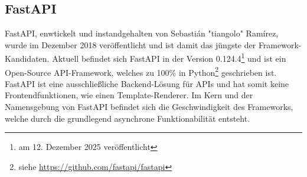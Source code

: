 \documentclass[letterpaper,11pt,leqno]{article}
\begin{document}
\subsection{FastAPI}
FastAPI, enwtickelt und instandgehalten von Sebastián "tiangolo" Ramírez, wurde im Dezember 2018
veröffentlicht und ist damit das jüngste der Framework-Kandidaten. Aktuell befindet sich FastAPI in
der Version 0.124.4\footnote{am 12. Dezember 2025 veröffentlicht} und ist ein Open-Source
API-Framework, welches zu 100\% in Python\footnote{siehe \url{https://github.com/fastapi/fastapi}}
geschrieben ist. FastAPI ist eine ausschließliche Backend-Lösung für APIs und hat somit keine
Frontendfunktionen, wie einen Template-Renderer. Im Kern und der Namensgebung von FastAPI befindet
sich die Geschwindigkeit des Frameworks, welche durch die grundlegend asynchrone Funktionabilität
entsteht.
\end{document}
